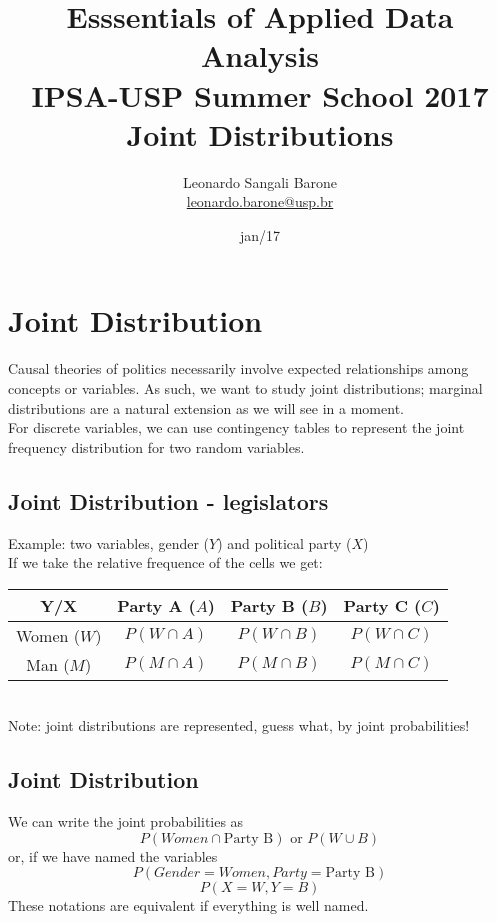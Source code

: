 \documentclass[11pt]{article}
\title{\textbf{Esssentials of Applied Data Analysis\\
				IPSA-USP Summer School 2017}\newline\\
				Joint Distributions}
\author{Leonardo Sangali Barone\\ 	\href{leonardo.barone@usp.br}{leonardo.barone@usp.br}}
\date{jan/17}
\begin{document}
\maketitle


\section*{Joint Distribution}

	Causal theories of politics necessarily involve expected relationships among concepts or variables. As such, we want to study joint distributions; marginal distributions are a natural extension as we will see in a moment.
	\newline\\
	For discrete variables, we can use contingency tables to represent the joint frequency distribution for two random variables.


	\subsection*{Joint Distribution - legislators}
	
	Example: two variables, gender ($Y$) and political party ($X$)\\
	If we take the relative frequence of the cells we get:\\

	\begin{tabular}{|c|ccc|}
\hline
	Y/X & Party A ($A$) & Party B ($B$) & Party C ($C$)\\
\hline
	Women ($W$) & $P(W \cap A)$ & $P(W \cap B)$ & $P(W \cap C)$\\
	Man ($M$) & $P(M \cap A)$ & $P(M \cap B)$ & $P(M \cap C)$\\
\hline
\end{tabular}\newline\\
Note: joint distributions are represented, guess what, by joint probabilities!


	\subsection*{Joint Distribution }
	We can write the joint probabilities as \[P(Women \cap \text{Party B}) \text{ or }P(W \cup B)\] or, if we have named the variables \[P(Gender = Women, Party = \text{Party B})\] \[P(X = W, Y = B)\] These notations are equivalent if everything is well named.
\end{document}
